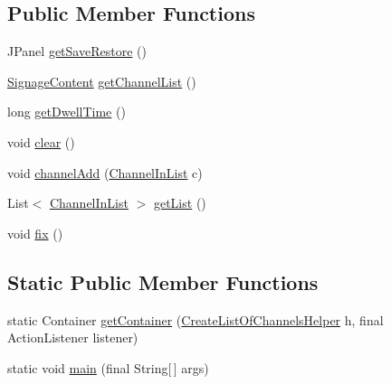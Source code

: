 \subsection*{Public Member Functions}
\begin{DoxyCompactItemize}
\item 
J\-Panel \hyperlink{classgov_1_1fnal_1_1ppd_1_1dd_1_1channel_1_1list_1_1CreateListOfChannels_a61f43bd5b3bba837c4f210f5d5dae22f}{get\-Save\-Restore} ()
\item 
\hyperlink{interfacegov_1_1fnal_1_1ppd_1_1dd_1_1signage_1_1SignageContent}{Signage\-Content} \hyperlink{classgov_1_1fnal_1_1ppd_1_1dd_1_1channel_1_1list_1_1CreateListOfChannels_a1dd7205ca04851ccb375e04919cb91ca}{get\-Channel\-List} ()
\item 
long \hyperlink{classgov_1_1fnal_1_1ppd_1_1dd_1_1channel_1_1list_1_1CreateListOfChannels_afe71d92d0b9f2df4eccd8a4ddefa08a0}{get\-Dwell\-Time} ()
\item 
void \hyperlink{classgov_1_1fnal_1_1ppd_1_1dd_1_1channel_1_1list_1_1CreateListOfChannels_a1ec0b549bcd66b851487792a951880f2}{clear} ()
\item 
void \hyperlink{classgov_1_1fnal_1_1ppd_1_1dd_1_1channel_1_1list_1_1CreateListOfChannels_a45a7590a0959d934a3c084af35bcd80c}{channel\-Add} (\hyperlink{interfacegov_1_1fnal_1_1ppd_1_1dd_1_1channel_1_1ChannelInList}{Channel\-In\-List} c)
\item 
List$<$ \hyperlink{interfacegov_1_1fnal_1_1ppd_1_1dd_1_1channel_1_1ChannelInList}{Channel\-In\-List} $>$ \hyperlink{classgov_1_1fnal_1_1ppd_1_1dd_1_1channel_1_1list_1_1CreateListOfChannels_a69c4ef63a7b4679fdb998e5a801b8203}{get\-List} ()
\item 
void \hyperlink{classgov_1_1fnal_1_1ppd_1_1dd_1_1channel_1_1list_1_1CreateListOfChannels_a5b161ef966b292e003862b6aeb584647}{fix} ()
\end{DoxyCompactItemize}
\subsection*{Static Public Member Functions}
\begin{DoxyCompactItemize}
\item 
static Container \hyperlink{classgov_1_1fnal_1_1ppd_1_1dd_1_1channel_1_1list_1_1CreateListOfChannels_a8a0dc66827626a2c196a42054873d1ae}{get\-Container} (\hyperlink{classgov_1_1fnal_1_1ppd_1_1dd_1_1channel_1_1list_1_1CreateListOfChannelsHelper}{Create\-List\-Of\-Channels\-Helper} h, final Action\-Listener listener)
\item 
static void \hyperlink{classgov_1_1fnal_1_1ppd_1_1dd_1_1channel_1_1list_1_1CreateListOfChannels_ac88c04e3076b13d8d15091caf3f87d3e}{main} (final String\mbox{[}$\,$\mbox{]} args)
\end{DoxyCompactItemize}
